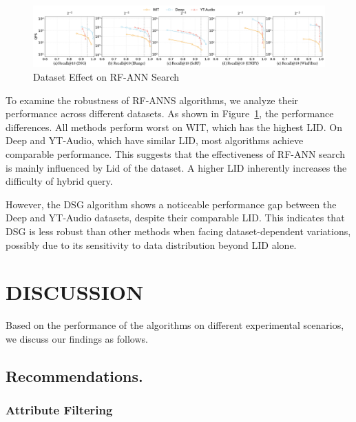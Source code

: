 \documentclass[sigconf, nonacm]{acmart}
\begin{document}
\begin{sloppypar}
\begin{figure}[htbp]
    \centering
    \setlength{\abovecaptionskip}{0cm}
    \setlength{\belowcaptionskip}{-0.4cm}
    \includegraphics[width=\textwidth]{figures/exp/exp_8_3.pdf}
    \caption{Dataset Effect on RF-ANN Search}
    \label{fig:exp_8_3}
\end{figure}


To examine the robustness of RF-ANNS algorithms, we analyze their performance across different datasets. As shown in Figure~\ref{fig:exp_8_3}, the performance differences. All methods perform worst on WIT, which has the highest LID. On Deep and YT-Audio, which have similar LID, most algorithms achieve comparable performance. 
This suggests that the effectiveness of RF-ANN search is mainly influenced by Lid of the dataset. A higher LID inherently increases the difficulty of hybrid query.

However, the DSG algorithm shows a noticeable performance gap between the Deep and YT-Audio datasets, despite their comparable LID. This indicates that DSG is less robust than other methods when facing dataset-dependent variations, possibly due to its sensitivity to data distribution beyond LID alone.

\section{DISCUSSION}
Based on the performance of the algorithms on different experimental scenarios, we discuss our findings as follows.


\subsection{Recommendations.}
\subsubsection{\textbf{Attribute Filtering}}


\begin{table}[htbp]
\centering
\setlength{\abovecaptionskip}{0.05cm}
\caption{Algorithm Recommendation per Scenario}
\end{table}
\end{sloppypar}
\end{document}
